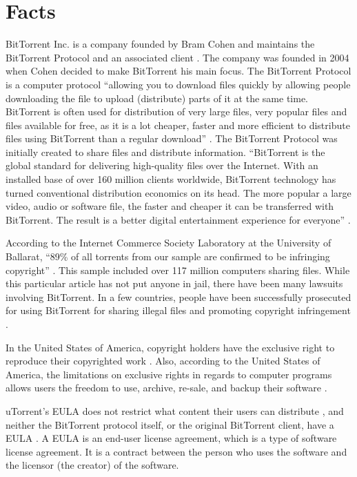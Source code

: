 \documentclass[11pt]{article}
\begin{document}
\section{Facts}
BitTorrent Inc. is a company founded by Bram Cohen and maintains the BitTorrent Protocol and an associated client \cite{btabout}. The company was founded in 2004 when Cohen decided to make BitTorrent his main focus. The BitTorrent Protocol is a computer protocol ``allowing you to download files quickly by allowing people downloading the file to upload (distribute) parts of it at the same time. BitTorrent is often used for distribution of very large files, very popular files and files available for free, as it is a lot cheaper, faster and more efficient to distribute files using BitTorrent than a regular download'' \cite{btabout}.  The BitTorrent Protocol was initially created to share files and distribute information. ``BitTorrent is the global standard for delivering high-quality files over the Internet. With an installed base of over 160 million clients worldwide, BitTorrent technology has turned conventional distribution economics on its head. The more popular a large video, audio or software file, the faster and cheaper it can be transferred with BitTorrent. The result is a better digital entertainment experience for everyone'' \cite{btabout}.

According to the Internet Commerce Society Laboratory at the University of Ballarat, ``89\% of all torrents from our sample are confirmed to be infringing copyright'' \cite{ICSL}. This sample included over 117 million computers sharing files. While this particular article has not put anyone in jail, there have been many lawsuits involving BitTorrent. In a few countries, people have been successfully prosecuted for using BitTorrent for sharing illegal files and promoting copyright infringement \cite{tpbverdict}.

In the United States of America, copyright holders have the exclusive right to reproduce their copyrighted work \cite{t17c1s106}. Also, according to the United States of America, the limitations on exclusive rights in regards to computer programs allows users the freedom to use, archive, re-sale, and backup their software \cite{t17s117}.

uTorrent's EULA does not restrict what content their users can distribute \cite{utorrentEula}, and neither the BitTorrent protocol itself, or the original BitTorrent client, have a EULA \cite{utorrentEula}. A EULA is an end-user license agreement, which is a type of software license agreement. It is a contract between the person who uses the software and the licensor (the creator) of the software.
\end{document}
